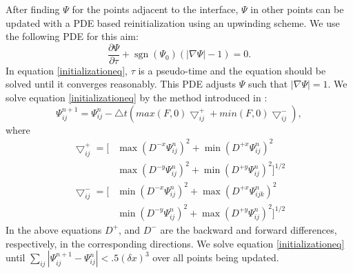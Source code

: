 \documentclass[review]{elsarticle}
\DeclareMathOperator{\sgn}{sgn}
\begin{document}
After finding $\varPsi$ for the points adjacent to the interface, $\varPsi$ in other points can be updated with a PDE based reinitialization using an upwinding scheme. 
We use the following PDE for this aim:
\begin{equation}\label{initializationeq}
        \frac{\partial \varPsi}{\partial \tau} + \sgn (\varPsi_0) (|\nabla \varPsi| - 1)= 0.
\end{equation}
In equation \eqref{initializationeq}, $\tau$ is a pseudo-time and the equation should be solved until it converges reasonably. This PDE adjusts $\varPsi$ such that $|\nabla \varPsi|=1$.
We solve equation \eqref{initializationeq} by the method introduced in \cite{Adalsteinsson1999}:
\begin{equation}
        \varPsi_{ij}^{n+1}=\varPsi_{ij}^{n}-\bigtriangleup t \left(max(F,0)\bigtriangledown_{ij}^{+}+min(F,0)\bigtriangledown_{ij}^{-} \right),
\end{equation}
where 
\begin{equation}
        \begin{aligned}
                \bigtriangledown_{ij}^{+} = \big[ & \max(D^{-x}\varPsi_{ij}^{n})^2 + \min(D^{+x}\varPsi_{ij}^{n})^2
                \\& \max(D^{-y}\varPsi_{ij}^{n})^2 + \min(D^{+y}\varPsi_{ij}^{n})^2 \big]^{1/2}
        \end{aligned}
\end{equation}
\begin{equation}
        \begin{aligned}
                \bigtriangledown_{ij}^{-} = \big[ & \min(D^{-x}\varPsi_{ij}^{n})^2 + \max(D^{+x}\varPsi_{ijk}^{n})^2
                \\& \min(D^{-y}\varPsi_{ij}^{n})^2 + \max(D^{+y}\varPsi_{ij}^{n})^2 \big]^{1/2}
        \end{aligned}
\end{equation} 
In the above equations $D^+$, and $D^-$ are the backward and forward differences, respectively, in the corresponding directions.
We solve equation \eqref{initializationeq} until $\sum\limits_{ij}|\varPsi_{ij}^{n+1} -\varPsi_{ij}^{n}| < .5 (\delta x)^3$ over all points being updated.
\end{document}
